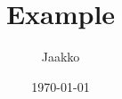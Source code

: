 \documentclass{perej1-manuscript}
\title{Example}
\author{Jaakko}
\date{\today}
\begin{document}
\maketitle

\blindtext
\end{document}

